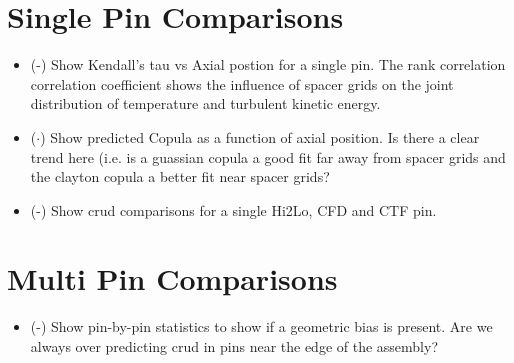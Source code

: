 
\section{Single Pin Comparisons}

\begin{itemize}
    \item (\checkmark-) Show Kendall's tau vs Axial postion for a single pin.  The rank correlation correlation coefficient shows
    the influence of spacer grids on the joint distribution of temperature and turbulent kinetic energy.
    \item ($\cdot$) Show predicted Copula as a function of axial position.  Is there a clear trend here (i.e. is a guassian copula
    a good fit far away from spacer grids and the clayton copula a better fit near spacer grids?
    \item (\checkmark-) Show crud comparisons for a single Hi2Lo, CFD and CTF pin.
\end{itemize}

\section{Multi Pin Comparisons}

\begin{itemize}
    \item (\checkmark-) Show pin-by-pin statistics to show if a geometric bias is present.  Are we always over predicting crud
    in pins near the edge of the assembly?
\end{itemize}
